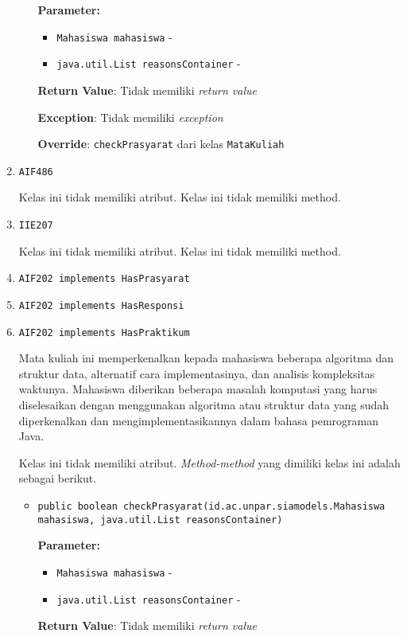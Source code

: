 \documentclass{article}
\begin{document}
\begin{enumerate}
\begin{itemize}
\textbf{Parameter:}
\begin{itemize}
\item \texttt{Mahasiswa mahasiswa} - 
\item \texttt{java.util.List reasonsContainer} - 
\end{itemize}
\textbf{Return Value}: Tidak memiliki \textit{return value}

\textbf{Exception}: Tidak memiliki \textit{exception}

\textbf{Override}: \texttt{checkPrasyarat} dari kelas \texttt{MataKuliah}

\end{itemize}
\item \texttt{AIF486}



Kelas ini tidak memiliki atribut. Kelas ini tidak memiliki method. \item \texttt{IIE207}



Kelas ini tidak memiliki atribut. Kelas ini tidak memiliki method. \item \texttt{AIF202 implements HasPrasyarat}

\item \texttt{AIF202 implements HasResponsi}

\item \texttt{AIF202 implements HasPraktikum}

Mata kuliah ini memperkenalkan kepada mahasiswa beberapa algoritma dan 
 struktur data, alternatif cara implementasinya, dan analisis kompleksitas 
 waktunya. Mahasiswa diberikan beberapa masalah komputasi yang harus 
 diselesaikan dengan menggunakan algoritma atau struktur data yang sudah 
 diperkenalkan dan mengimplementasikannya dalam bahasa pemrograman Java.

Kelas ini tidak memiliki atribut. \textit{Method-method} yang dimiliki kelas ini adalah sebagai berikut.
\begin{itemize}
\item \texttt{public boolean checkPrasyarat(id.ac.unpar.siamodels.Mahasiswa mahasiswa, java.util.List reasonsContainer)}



\textbf{Parameter:}
\begin{itemize}
\item \texttt{Mahasiswa mahasiswa} - 
\item \texttt{java.util.List reasonsContainer} - 
\end{itemize}
\textbf{Return Value}: Tidak memiliki \textit{return value}


\end{itemize}
\end{enumerate}
\end{document}
